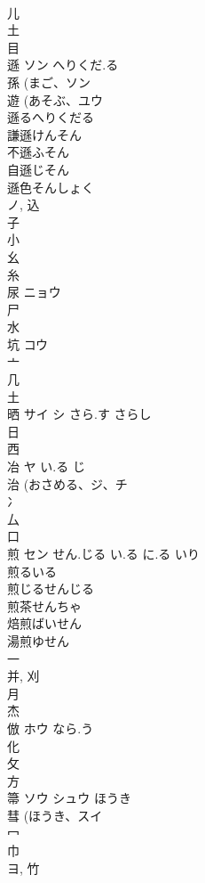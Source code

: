 \documentclass[8pt]{extreport}
\begin{document}
\begin{CJK}{UTF8}{min}
\\	儿 
\\	土 
\\	目 
\\	遜	ソン	へりくだ.る	
\\	孫 (まご、ソン 
\\	遊 (あそぶ、ユウ 
\\	遜るへりくだる 
\\	謙遜けんそん
\\	不遜ふそん
\\	自遜じそん
\\	遜色そんしょく 
\\	ノ, 込 
\\	子 
\\	小 
\\	幺 
\\	糸 
\\	尿	ニョウ		
\\	尸 
\\	水 
\\	坑	コウ		
\\	亠 
\\	几 
\\	土 
\\	晒	サイ シ	さら.す さらし	
\\	日 
\\	西 
\\	冶	ヤ	い.る じ	
\\	治 (おさめる、ジ、チ 
\\	冫 
\\	厶 
\\	口 
\\	煎	セン	せん.じる い.る に.る いり	
\\	煎るいる 
\\	煎じるせんじる 
\\	煎茶せんちゃ 
\\	焙煎ばいせん 
\\	湯煎ゆせん 
\\	一 
\\	并, 刈 
\\	月 
\\	杰	
\\	倣	ホウ	なら.う	
\\	化 
\\	攵 
\\	方 
\\	箒	ソウ シュウ	ほうき	
\\	彗 (ほうき、スイ 
\\	冖 
\\	巾 
\\	ヨ, 竹 

\end{CJK}
\end{document}
